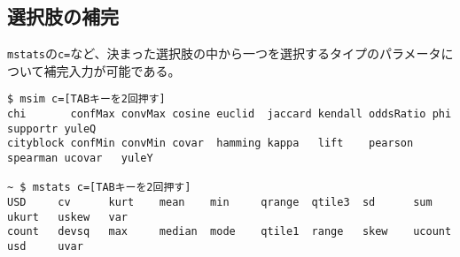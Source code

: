 \subsection{選択肢の補完\label{sect:bash_comp_items}}
\verb|mstats|の\verb|c=|など、決まった選択肢の中から一つを選択するタイプのパラメータについて補完入力が可能である。
\begin{Verbatim}[baselinestretch=0.7,frame=single]
$ msim c=[TABキーを2回押す]
chi       confMax convMax cosine euclid  jaccard kendall oddsRatio phi      supportr yuleQ
cityblock confMin convMin covar  hamming kappa   lift    pearson   spearman ucovar   yuleY

~ $ mstats c=[TABキーを2回押す]
USD     cv      kurt    mean    min     qrange  qtile3  sd      sum     ukurt   uskew   var
count   devsq   max     median  mode    qtile1  range   skew    ucount  usd     uvar

\end{Verbatim}


%

